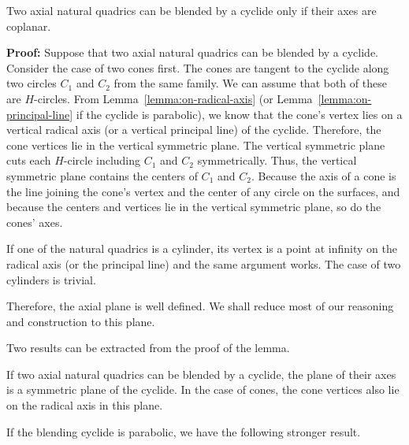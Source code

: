 \begin{lemma}
\label{lemma:coplanar}
     Two axial natural quadrics can be blended by a cyclide only if their axes 
are coplanar.
\end{lemma}
{\bf Proof:}  Suppose that two axial natural quadrics can be blended by a
cyclide.  Consider the case of two cones first.  The cones are tangent to the
cyclide along two circles $C_1$ and $C_2$ from the same family.  We can assume
that both of these are $H$-circles.  From Lemma~\ref{lemma:on-radical-axis} 
(or Lemma~\ref{lemma:on-principal-line} if the cyclide is parabolic),
we know that the cone's vertex lies on a vertical radical axis 
(or a vertical principal line) of the cyclide.  Therefore, the cone vertices 
lie in the vertical symmetric plane.  The vertical symmetric plane cuts
each $H$-circle including $C_1$ and $C_2$ symmetrically.  
Thus, the vertical symmetric plane contains the centers
of $C_1$ and $C_2$.  Because the axis of a cone is the line joining the cone's
vertex and the center of any circle on the surfaces, and because the centers
and vertices lie in the vertical symmetric plane, so do the cones' axes.

     If one of the natural quadrics is a cylinder, its vertex is a point at
infinity on the radical axis (or the principal line) and the same argument
works.  The case of two cylinders is trivial.  \QED

     Therefore, the axial plane is well defined.  We shall reduce most of our
reasoning and construction to this plane.

     Two results can be extracted from the proof of the lemma.

\begin{corollary}
\label{cor:on-radical-axis}
     If two axial natural quadrics can be blended by a cyclide, the plane of
their axes is a symmetric plane of the cyclide.  In the case of cones, the
cone vertices also lie on the radical axis in this plane.
\end{corollary}

     If the blending cyclide is parabolic, we have the following stronger 
result.

